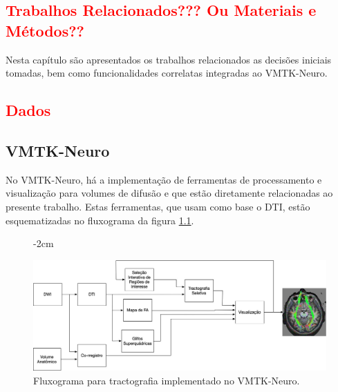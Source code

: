 \documentclass[
    12pt,                %
    oneside,            %
    a4paper,            %
    english,            %
    french,                %
    spanish,            %
    brazil                %
    ]{abntex2}
\begin{document}
\textcolor{red}{
\chapter{Trabalhos Relacionados??? Ou Materiais e Métodos??}
\label{cap:metodos}
}


Nesta capítulo são apresentados os trabalhos relacionados as decisões iniciais tomadas, bem como funcionalidades correlatas integradas ao VMTK-Neuro.

\textcolor{red}{
\section{Dados}
}

\section{VMTK-Neuro}
\label{AlgoritmosVMTK}


No VMTK-Neuro, há a implementação de ferramentas de processamento e visualização para volumes de difusão e que estão diretamente relacionadas ao presente trabalho. Estas ferramentas, que usam como base o DTI, estão esquematizadas no fluxograma da figura \ref{fig::PipelineDTI_tracto}.

\begin{figure}[ht]
   \centering
       \addtolength{\leftskip} {-2cm} %
    \addtolength{\rightskip}{-2cm}

    \centering
    \includegraphics[width=1.0\linewidth, angle=0]{figs/Fluxogramas/PipelineDTI_tracto.jpg}
    \caption{Fluxograma para tractografia implementado no VMTK-Neuro.}
    \label{fig::PipelineDTI_tracto}
\end{figure}
\end{document}
